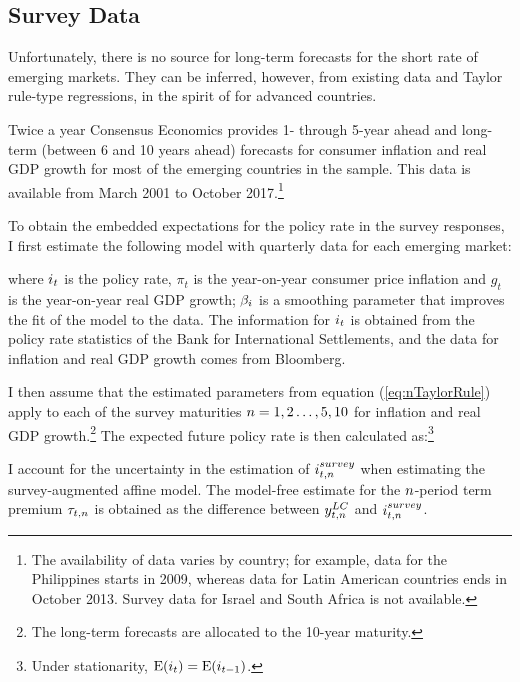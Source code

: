 {%



\subsection{Survey Data} \label{sec:SurveyData}
\iftoggle{toclinks}{\gototoc}{} %

Unfortunately, there is no source for long-term forecasts for the short rate of emerging markets. They can be inferred, however, from existing data and Taylor rule-type regressions, in the spirit of \cite{Wright:2011} for advanced countries.

Twice a year Consensus Economics provides 1- through 5-year ahead and long-term (between 6 and 10 years ahead) forecasts for consumer inflation and real GDP growth for most of the emerging countries in the sample. This data is available from March 2001 to October 2017.\footnote{ The availability of data varies by country; for example, data for the Philippines starts in 2009, whereas data for Latin American countries ends in October 2013. Survey data for Israel and South Africa is not available.}

To obtain the embedded expectations for the policy rate in the survey responses, I first estimate the following model with quarterly data for each emerging market:
	
\noindent where \(i_{t}\) is the policy rate, \(\pi_{t}\) is the year-on-year consumer price inflation and \(g_{t}\) is the year-on-year real GDP growth; 
\(\beta_{i}\) is a smoothing parameter that improves the fit of the model to the data. 
The information for \(i_{t}\) is obtained from the policy rate statistics of the Bank for International Settlements, and the data for inflation and real GDP growth comes from Bloomberg.

I then assume that the estimated parameters from equation (\ref{eq:nTaylorRule}) apply to each of the survey maturities \(n = 1, 2 \ldots, 5, 10\) for inflation and real GDP growth.\footnote{ The long-term forecasts are allocated to the 10-year maturity.}
The expected future policy rate is then calculated as:\footnote{ Under stationarity, \(\mathrm{E}(i_{t}) = \mathrm{E}(i_{t-1})\).}
	
I account for the uncertainty in the estimation of \(i_{t,n}^{survey}\) when estimating the survey-augmented affine model.
The model-free estimate for the \(n\)-period term premium \(\tau_{t,n}\) is obtained as the difference between \(y_{t,n} ^{LC}\) and \(i_{t,n}^{survey}\).
%	

}

